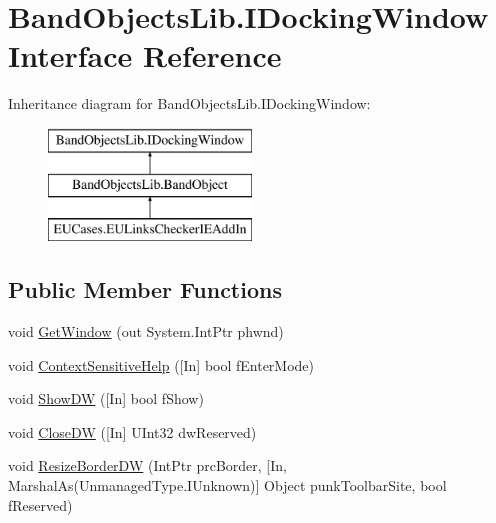 \hypertarget{interface_band_objects_lib_1_1_i_docking_window}{\section{Band\+Objects\+Lib.\+I\+Docking\+Window Interface Reference}
\label{interface_band_objects_lib_1_1_i_docking_window}
}
Inheritance diagram for Band\+Objects\+Lib.\+I\+Docking\+Window\+:\begin{figure}[H]
\begin{center}
\leavevmode
\includegraphics[height=3.000000cm]{interface_band_objects_lib_1_1_i_docking_window}
\end{center}
\end{figure}
\subsection*{Public Member Functions}
\begin{DoxyCompactItemize}
\item 
void \hyperlink{interface_band_objects_lib_1_1_i_docking_window_ae712f78f82ccbba722022122a73e9ae8}{Get\+Window} (out System.\+Int\+Ptr phwnd)
\item 
void \hyperlink{interface_band_objects_lib_1_1_i_docking_window_a7654bc6b269e3fa97fc738dc22a4b4c6}{Context\+Sensitive\+Help} (\mbox{[}In\mbox{]} bool f\+Enter\+Mode)
\item 
void \hyperlink{interface_band_objects_lib_1_1_i_docking_window_ad0698e9293c0251cbd034158cc7e007b}{Show\+D\+W} (\mbox{[}In\mbox{]} bool f\+Show)
\item 
void \hyperlink{interface_band_objects_lib_1_1_i_docking_window_a08bfc26284d6a6dd075301649c9bf308}{Close\+D\+W} (\mbox{[}In\mbox{]} U\+Int32 dw\+Reserved)
\item 
void \hyperlink{interface_band_objects_lib_1_1_i_docking_window_ae68b45b3c30dddeb663076fd996caee7}{Resize\+Border\+D\+W} (Int\+Ptr prc\+Border, \mbox{[}In, Marshal\+As(Unmanaged\+Type.\+I\+Unknown)\mbox{]} Object punk\+Toolbar\+Site, bool f\+Reserved)
\end{DoxyCompactItemize}


